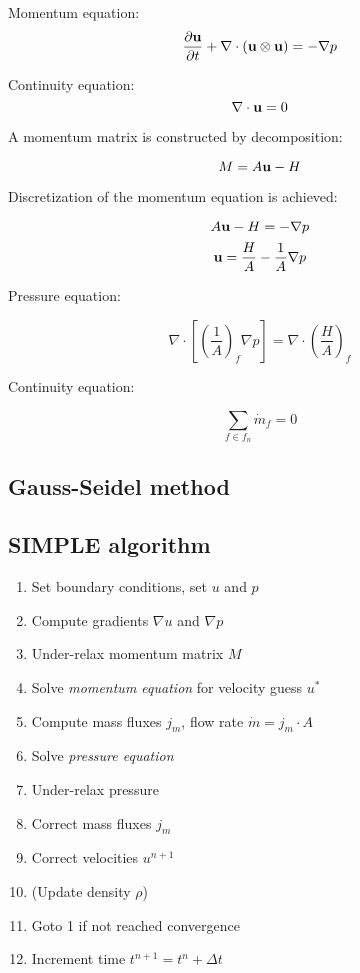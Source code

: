 \documentclass[12pt]{article}
\newcommand{\lb}{\left(}
\newcommand{\rb}{\right)}
\newcommand{\vb}[1]{\text{\textbf{#1}}}
\begin{document}
Momentum equation:
$$
\frac{\partial \vb u}{\partial t} + \nabla \cdot (\vb u \otimes \vb u) = - \nabla p
$$

Continuity equation:
$$
\nabla \cdot \vb u = 0
$$

A momentum matrix is constructed by decomposition:

$$
M = A \vb u - H
$$

Discretization of the momentum equation is achieved:

$$
A \vb u - H = - \nabla p
$$
\begin{equation}
  \vb u = \frac{H}{A} - \frac{1}{A} \nabla p
\end{equation}

Pressure equation:

\begin{equation}
  \nabla \cdot \left [ \lb \frac{1}{A} \rb_f \nabla p \right] = \nabla \cdot \lb \frac{H}{A} \rb_f
\end{equation}

Continuity equation:

$$
\sum_{f \in f_n} \dot m_f = 0
$$

\subsection{Gauss-Seidel method}

\subsection{SIMPLE algorithm}

\begin{enumerate}
\item Set boundary conditions, set $u$ and $p$
\item Compute gradients $\nabla u$ and $\nabla p$
\item Under-relax momentum matrix $M$
\item Solve \textit{momentum equation} for velocity guess $u^*$
\item Compute mass fluxes $j_m$, flow rate $\dot m = j_m \cdot A$
\item Solve \textit{pressure equation}
\item Under-relax pressure
\item Correct mass fluxes $j_m$
\item Correct velocities $u^{n+1}$
\item (Update density $\rho$)
\item Goto 1 if not reached convergence
\item Increment time $t^{n+1} = t^n + \Delta t$
\end{enumerate}
\end{document}
